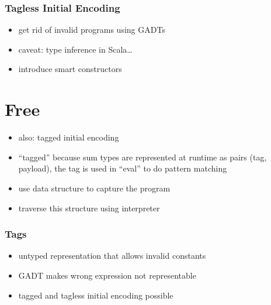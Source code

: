 \documentclass[aspectratio=169]{beamer}
\begin{document}
\begin{frame}
  \frametitle{Tagless Initial Encoding}
  \begin{itemize}
  \item get rid of invalid programs using GADTs
  \item caveat: type inference in Scala\ldots{}
  \item introduce smart constructors
  \end{itemize}
\end{frame}

\section{Free}\label{sec:free}

\begin{frame}
  \begin{itemize}
  \item also: tagged initial encoding
  \item ``tagged'' because sum types are represented at runtime as
    pairs (tag, payload), the tag is used in ``eval'' to do pattern
    matching
  \item use data structure to capture the program
  \item traverse this structure using interpreter
  \end{itemize}
\end{frame}

\begin{frame}
  \frametitle{Tags}
  \begin{itemize}
  \item untyped representation that allows invalid constants
  \item GADT makes wrong expression not representable
  \item tagged and tagless initial encoding possible
  \end{itemize}
\end{frame}
\end{document}
